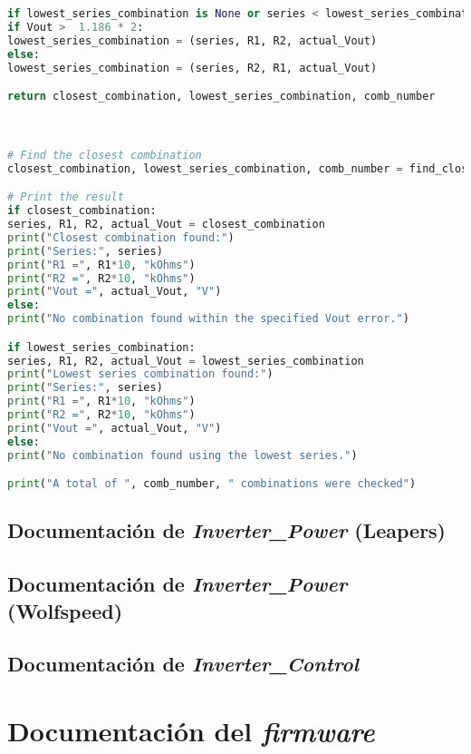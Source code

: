 \begin{lstlisting}[language=Python, basicstyle=\ttfamily\small, breaklines=true, frame=single]
if lowest_series_combination is None or series < lowest_series_combination[0]:
if Vout >  1.186 * 2:
lowest_series_combination = (series, R1, R2, actual_Vout)
else:
lowest_series_combination = (series, R2, R1, actual_Vout)

return closest_combination, lowest_series_combination, comb_number



# Find the closest combination
closest_combination, lowest_series_combination, comb_number = find_closest_combination(Vout, Vout_error)

# Print the result
if closest_combination:
series, R1, R2, actual_Vout = closest_combination
print("Closest combination found:")
print("Series:", series)
print("R1 =", R1*10, "kOhms")
print("R2 =", R2*10, "kOhms")
print("Vout =", actual_Vout, "V")
else:
print("No combination found within the specified Vout error.")

if lowest_series_combination:
series, R1, R2, actual_Vout = lowest_series_combination
print("Lowest series combination found:")
print("Series:", series)
print("R1 =", R1*10, "kOhms")
print("R2 =", R2*10, "kOhms")
print("Vout =", actual_Vout, "V")
else:
print("No combination found using the lowest series.")

print("A total of ", comb_number, " combinations were checked")
\end{lstlisting}
\section{Documentación de \textit{Inverter\_Power} (Leapers)}

\section{Documentación de \textit{Inverter\_Power} (Wolfspeed)}

\section{Documentación de \textit{Inverter\_Control}}



\chapter{Documentación del \textit{firmware}}

